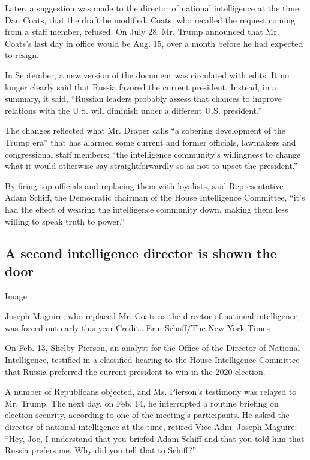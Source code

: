 Later, a suggestion was made to the director of national intelligence at
the time, Dan Coats, that the draft be modified. Coats, who recalled the
request coming from a staff member, refused. On July 28, Mr. Trump
announced that Mr. Coats's last day in office would be Aug. 15, over a
month before he had expected to resign.

In September, a new version of the document was circulated with edits.
It no longer clearly said that Russia favored the current president.
Instead, in a summary, it said, ``Russian leaders probably assess that
chances to improve relations with the U.S. will diminish under a
different U.S. president.''

The changes reflected what Mr. Draper calls ``a sobering development of
the Trump era'' that has alarmed some current and former officials,
lawmakers and congressional staff members: ``the intelligence
community's willingness to change what it would otherwise say
straightforwardly so as not to upset the president.''

By firing top officials and replacing them with loyalists, said
Representative Adam Schiff, the Democratic chairman of the House
Intelligence Committee, ``it's had the effect of wearing the
intelligence community down, making them less willing to speak truth to
power.''

\hypertarget{a-second-intelligence-director-is-shown-the-door}{%
\subsection{A second intelligence director is shown the
door}\label{a-second-intelligence-director-is-shown-the-door}}

Image

Joseph Maguire, who replaced Mr. Coats as the director of national
intelligence, was forced out early this year.Credit...Erin Schaff/The
New York Times

On Feb. 13, Shelby Pierson, an analyst for the Office of the Director of
National Intelligence, testified in a classified hearing to the House
Intelligence Committee that Russia preferred the current president to
win in the 2020 election.

A number of Republicans objected, and Ms. Pierson's testimony was
relayed to Mr. Trump. The next day, on Feb. 14, he interrupted a routine
briefing on election security, according to one of the meeting's
participants. He asked the director of national intelligence at the
time, retired Vice Adm. Joseph Maguire: ``Hey, Joe, I understand that
you briefed Adam Schiff and that you told him that Russia prefers me.
Why did you tell that to Schiff?''

